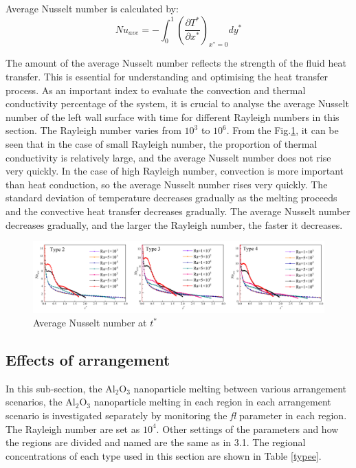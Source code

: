 \documentclass[preprint,12pt]{elsarticle}
\begin{document}
Average Nusselt number is calculated by:
\begin{equation}
	Nu_{ave}=-\int_0^1\left(\frac{\partial T^*}{\partial x^*}\right)_{x^*=0}dy^*
\end{equation}

The amount of the average Nusselt number reflects the strength of the fluid heat transfer. This is essential for understanding and optimising the heat transfer process. As an important index to evaluate the convection and thermal conductivity percentage of the system, it is crucial to analyse the average Nusselt number of the left wall surface with time for different Rayleigh numbers in this section. The Rayleigh number varies from $ 10^3 $ to $ 10^6 $. From the Fig.\ref{Fig_Nu}, it can be seen that in the case of small Rayleigh number, the proportion of thermal conductivity is relatively large, and the average Nusselt number does not rise very quickly. In the case of high Rayleigh number, convection is more important than heat conduction, so the average Nusselt number rises very quickly. The standard deviation of temperature decreases gradually as the melting proceeds and the convective heat transfer decreases gradually. The average Nusselt number decreases gradually, and the larger the Rayleigh number, the faster it decreases. 
\begin{figure}[H]
		\centering 
		\includegraphics[scale=0.5]{Fig/Nu-t.png}
		\caption{Average Nusselt number at $ t^* $  } 
		\label{Fig_Nu} 
	\end{figure}

	\subsection{Effects of arrangement}

In this sub-section, the Al$_2$O$_3$ nanoparticle melting between various arrangement scenarios, the Al$_2$O$_3$ nanoparticle melting in each region in each arrangement scenario is investigated separately by monitoring the \textit{fl} parameter in each region. 
The Rayleigh number are set as $ 10^4 $. 
Other settings of the parameters and how the regions are divided and named are the same as in 3.1.
The regional concentrations of each type used in this section are shown in Table \ref{typee}.
\end{document}
